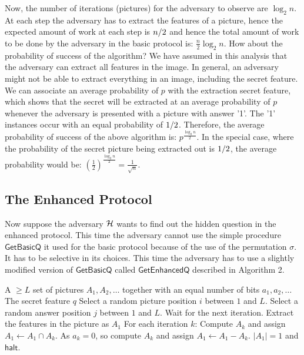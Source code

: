 \documentclass{llncs}
\begin{document}
Now, the number of iterations (pictures) for the adversary to observe are $\log _2 n$. At each step the adversary has to extract the features of a picture, hence the expected amount of work at each step is ${n \mathord{\left/
 {\vphantom {n 2}} \right.
 \kern-\nulldelimiterspace} 2}$
 and hence the total amount of work to be done by the adversary in the basic protocol is: $\frac{n}{2}\log _2 n$. How about the probability of success of the algorithm? We have assumed in this analysis that the adversary can extract all features in the image. In general, an adversary might not be able to extract everything in an image, including the secret feature. We can associate an average probability of $p$ with the extraction secret feature, which shows that the secret will be extracted at an average probability of $p$ whenever the adversary is presented with a picture with answer '1'. The '1' instances occur with an equal probability of ${1 \mathord{\left/
 {\vphantom {1 2}} \right.
 \kern-\nulldelimiterspace} 2}$. Therefore, the average probability of success of the above algorithm is: $p^{\frac{{\log _2 n}}{2}} $. In the special case, where the probability of the secret picture being extracted out is ${1 \mathord{\left/
 {\vphantom {1 2}} \right.
 \kern-\nulldelimiterspace} 2}$, the average probability would be: $\left( {\frac{1}{2}} \right)^{\frac{{\log _2 n}}{2}}  = \frac{1}{{\sqrt n }}$.

\subsection{The Enhanced Protocol}
Now suppose the adversary ${\cal H}$ wants to find out the hidden question in the enhanced protocol. This time the adversary cannot use the simple procedure $\mathsf{GetBasicQ}$ it used for the basic protocol because of the use of the permutation $\sigma$. It has to be selective in its choices. This time the adversary has to use a slightly modified version of $\mathsf{GetBasicQ}$ called $\mathsf{GetEnhancedQ}$ described in Algorithm 2. 



\begin{algorithm}[h!]
\caption{$\mathsf{GetEnhancedQ}$}\label{alg:facty}
\begin{algorithmic}[1]
\REQUIRE A $ \ge L$ set of pictures $A_1 ,A_2 , \ldots$ together with an equal number of bits $a_1 ,a_2 , \ldots $
\ENSURE The secret feature $q$
\medskip
\STATE Select a random picture position $i$ between $1$ and $L$.
\STATE Select a random answer position $j$ between $1$ and $L$.
	\STATE Wait for the next iteration.
\ELSE 
	\STATE Extract the features in the picture as $A_1$
	\REPEAT
		\STATE For each iteration $k$:
			 \STATE Compute $A_k$ and assign $A_1  \leftarrow A_1  \cap A_k $.
		\ELSE
			 \STATE As $a_k  = 0$, so compute $A_k$ and assign $A_1  \leftarrow A_1  - A_k $. 
		\ENDIF
	\UNTIL $\left| {A_1 } \right| = 1$ and $\mathsf{halt}$.
\ENDIF
\end{algorithmic}
\end{algorithm}
\end{document}
